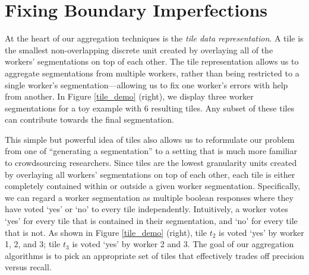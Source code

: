 \documentclass[letterpaper]{article}
\begin{document}

\section{Fixing Boundary Imperfections\label{precision}}
At the heart of our aggregation techniques is the \emph{tile data representation}. A tile is the smallest non-overlapping discrete unit created by overlaying all of the workers' segmentations on top of each other. 
The tile representation allows us to aggregate segmentations from multiple workers, rather than being restricted to a single worker's segmentation---allowing us to fix one worker's errors with help from another. In Figure \ref{tile_demo} (right), we display three worker segmentations for a toy example with 6 resulting tiles. Any subset of these tiles can contribute towards the final segmentation.
\par This simple but powerful idea of tiles also allows us to reformulate our problem from one of ``generating a segmentation'' to a setting that is much more familiar to crowdsourcing researchers. Since tiles are the lowest granularity units created by overlaying all workers' segmentations on top of each other, each tile is either completely contained within or outside a given worker segmentation. Specifically, we can regard a worker segmentation as multiple boolean responses where they have voted `yes' or `no' to every tile independently. Intuitively, a worker votes `yes' for every tile that is contained in their segmentation, and `no' for every tile that is not. As shown in Figure \ref{tile_demo} (right), tile $t_2$ is voted `yes' by worker 1, 2, and 3; tile $t_3$ is voted `yes' by worker 2 and 3. The goal of our aggregation algorithms is to pick an appropriate set of tiles that effectively trades off precision versus recall.
\end{document}
